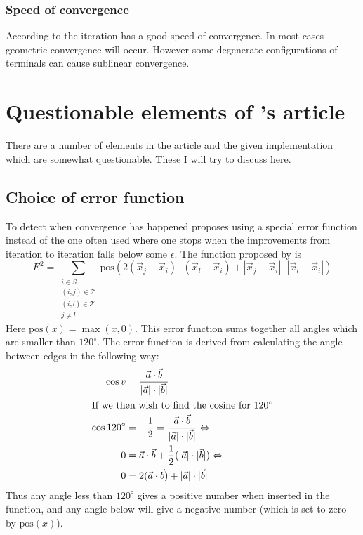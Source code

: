 \subsubsection{Speed of convergence}
\label{sec:speed-convergence}

According to \textcite[p.~150]{smith1992} the iteration has a good speed of
convergence. In most cases geometric convergence will occur. However some
degenerate configurations of terminals can cause sublinear convergence.

\section{Questionable elements of \citeauthor{smith1992}'s article}
\label{sec:quest-elem-smiths}

There are a number of elements in the article and the given
implementation~\cite{smith1992} which are somewhat questionable. These I will
try to discuss here.

\subsection{Choice of error function}
\label{sec:choice-error-funct}

To detect when convergence has happened \citeauthor{smith1992} proposes using a special
error function instead of the one often used where one stops when the
improvements from iteration to iteration falls below some $\epsilon$. The
function proposed by \citeauthor{smith1992} is
%
\begin{equation}
  E^2 = \sum_{
    \begin{array}{c} i \in S \\ (i,j) \in \mathcal{T} \\ (i,l) \in \mathcal{T} \\ j \ne l
    \end{array}} \text{pos} (2 (\vec x_j - \vec x_i) \cdot (\vec x_l - \vec x_i)
+ | \vec x_j - \vec x_i | \cdot | \vec x_l - \vec x_i |)
\end{equation}
%
Here $\text{pos}(x) = \max(x, 0)$. This error function sums together all angles which
are smaller than $120^{\circ}$. The error function is derived from calculating
the angle between edges in the following way:
%
\begin{align}
  \cos v & = \frac{\vec a \cdot \vec b}
    {|\vec a| \cdot |\vec b|}                 \\
  \intertext{If we then wish to find the cosine for $120^{\circ}$}
  \cos 120^{\circ}
         & = -\frac{1}{2} = \frac{\vec a \cdot \vec b}
    {|\vec a| \cdot |\vec b|} \Leftrightarrow \\
  0      & = \vec a \cdot \vec b + \frac{1}{2}
    (|\vec a| \cdot |\vec b|) \Leftrightarrow \\
  0      & = 2 (\vec a \cdot \vec b) + |\vec a| \cdot |\vec b|
\end{align}
%
Thus any angle less than $120^{\circ}$ gives a positive number when inserted in
the function, and any angle below will give a negative number (which is set to
zero by $\text{pos}(x)$).

